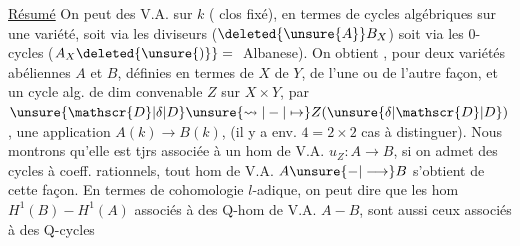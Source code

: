\uline{Résumé} On peut  des V.A. sur $k$ ( clos fixé),  en termes de cycles algébriques  sur une variété, soit via les diviseurs ($\deleted{\unsure{A}}B_X$) soit via les $0$-cycles ($A_X\deleted{\unsure{)}}={}$ Albanese). On obtient , pour deux variétés abéliennes $A$ et $B$, définies  en termes de $X$  de $Y$, de l'une ou de l'autre façon, et un cycle alg. de dim convenable $Z$ sur $X\times Y$, par $\unsure{\mathscr{D}|\delta|D}\unsure{\leadsto|-|\mapsto} Z(\unsure{\delta|\mathscr{D}|D})$, une application $A(k)\longrightarrow B(k)$,  (il y a env. $4=2\times2$ cas à distinguer). Nous montrons qu'elle est tjrs associée à un hom de V.A. $u_Z:A\longrightarrow B$,   si on admet des cycles à coeff. rationnels,  tout hom de V.A. $A\unsure{-|\longrightarrow} B$ s'obtient de cette façon. En termes de cohomologie $l$-adique, on peut dire que les hom $H^1(B)-H^1(A)$ associés à des $\mathrm{Q}$-hom de V.A. $A-B$, sont aussi ceux associés à des $\mathrm{Q}$-cycles
